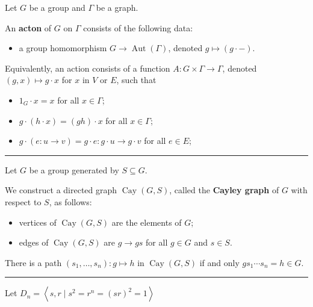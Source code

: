 \documentclass[12pt]{article}
\newcommand{\keyword}[1]{\textbf{#1}}
\newcommand{\sepline}{\rule{\textwidth}{0.4pt}}
\theoremstyle{definition}
\newcommand{\<}{\left\langle}
\renewcommand{\>}{\right\rangle}
\newcommand{\seq}{\subseteq}
\DeclareMathOperator{\Aut}{Aut}
\DeclareMathOperator{\Cay}{Cay}
\begin{document}
Let $G$ be a group and $\Gamma$ be a graph.

An \keyword{acton} of $G$ on $\Gamma$ consists of the following data:
\begin{itemize}
    \item a group homomorphism $G \to \Aut(\Gamma)$, denoted $g \mapsto (g \cdot -)$.
\end{itemize}

Equivalently, an action consists of a function $A : G \times \Gamma \to \Gamma$, denoted $(g, x) \mapsto g \cdot x$ for $x$ in $V$ or $E$, such that
\begin{itemize}
    \item $1_G \cdot x = x$ for all $x \in \Gamma$;
    \item $g \cdot (h \cdot x) = (gh) \cdot x$ for all $x \in \Gamma$;
    \item $g \cdot (e : u \to v) = g \cdot e : g \cdot u \to g \cdot v$ for all $e \in E$;
\end{itemize}

\sepline

Let $G$ be a group generated by $S \seq G$.

We construct a directed graph $\Cay(G, S)$, called the \keyword{Cayley graph} of $G$ with respect to $S$, as follows:
\begin{itemize}
    \item vertices of $\Cay(G, S)$ are the elements of $G$;
    \item edges of $\Cay(G, S)$ are $g \to gs$ for all $g \in G$ and $s \in S$.
\end{itemize}

There is a path $(s_1, \dots, s_n) : g \mapsto h$ in $\Cay(G, S)$ if and only $gs_1 \cdots s_n = h \in G$.

\sepline

Let $D_n = \<s, r \mid s^2 = r^n = (sr)^2 = 1\>$
\end{document}
